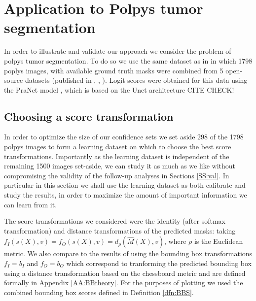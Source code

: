 \section{Application to Polpys tumor segmentation}\label{SS:res}
In order to illustrate and validate our approach we consider the problem of polpys tumor segmentation. To do so we use the same dataset as in \cite{Angelopoulos2022} in which 1798 poplys images, with available ground truth masks were combined from 5 open-source datasets (published in \cite{KVASIR2017}, \cite{Hyperkvasir2020} \cite{Bernal2012}, \cite{Silva2014}). Logit scores were obtained for this data using the PraNet model \cite{PraNet2020}, which is based on the Unet architecture CITE CHECK! 

\subsection{Choosing a score transformation}
In order to optimize the size of our confidence sets we set aside 298 of the 1798 polpys images to form a learning dataset on which to choose the best score transformations. Importantly as the learning dataset is independent of the remaining 1500 images set-aside, we can study it as much as we like without compromising the validity of the follow-up analyses in Sections \ref{SS:val}. In particular in this section we shall use the learning dataset as both calibrate and study the results, in order to maximize the amount of important information we can learn from it.

The score transformations we considered were the identity (after softmax transformation) and distance transformations of the predicted masks:  taking $f_I(s(X), v) = f_O(s(X), v) = d_\rho(\hat{M}(X), v)$, where $\rho$ is the Euclidean metric. We also compare to the results of using the bounding box transformations $f_I = b_I$ and $f_O = b_O$ which correspond to tranforming the predicted bounding box using a distance transformation based on the chessboard metric and are defined formally in Appendix \ref{AA:BBtheory}. For the purposes of plotting we used the combined bounding box scores defined in Definition \ref{dfn:BBS}.

